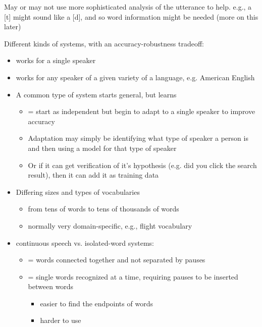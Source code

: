 \documentclass[a4paper,landscape,headrule,footrule,xetex]{foils}
\begin{document}
May or may not use more sophisticated analysis of the utterance to
help. e.g., a [t] might sound like a [d], and so word information
might be needed (more on this later)











Different kinds of systems, with an accuracy-robustness tradeoff: 

\begin{itemize}
\item {} works for a single speaker
\item {} works for any speaker of a given variety of a language, e.g. American English
\item A common type of system starts general, but learns  
\begin{itemize}
\item {} = start as independent but begin to adapt to a single speaker to improve accuracy
\item Adaptation may simply be identifying what type of speaker a
  person is and then using a model for that type of speaker
\item Or if it can get verification of it's hypothesis (e.g. did you
  click the search result), then it can add it as training data
\end{itemize}
\end{itemize}









\begin{itemize}
\item Differing sizes and types of vocabularies
\begin{itemize}
\item from tens of words to tens of thousands of words
\item normally very domain-specific, e.g., flight vocabulary
\end{itemize}
\item continuous speech vs. isolated-word systems:
\begin{itemize}
\item {} = words connected together and not separated by pauses
\item {} = single words recognized at a time, requiring pauses to be inserted between words 
  \begin{itemize}
  \item easier to find the endpoints of words
  \item harder to use
  \end{itemize}
\end{itemize}
\end{itemize}
\end{document}
